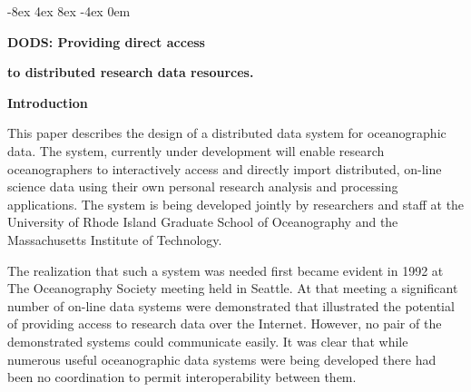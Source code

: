 
%



\topmargin -8ex
\footskip 4ex
\headheight 8ex
\footheight -4ex
\textwidth 6.25in
\textheight 8.25in
\oddsidemargin 0em
\def \dods{Distributed Oceanographic Data System }
\def \dodsns{Distributed Oceanographic Data System}
\def \1em{\hskip 1em}
\def \2em{\hskip 2em}
\def \3em{\hskip 3em}
\def \4em{\hskip 4em}
\def \dap{data access protocol }
\def \dapns{data access protocol}



\Large
\centerline {\bf DODS: Providing direct access }
\centerline {\bf to distributed research data resources.}
\normalsize

\renewcommand{\baselinestretch}{1.5}

\large
\bigskip
\noindent
{\bf Introduction}
\medskip
\normalsize 
\renewcommand{\baselinestretch}{1.5}

\noindent
This paper describes the design of a distributed data system for
oceanographic data. The system, currently under development will enable
research oceanographers to interactively access and directly import
distributed, on-line science data using their own personal research analysis
and processing applications. The system is being developed jointly by
researchers and staff at the University of Rhode Island Graduate School of
Oceanography and the Massachusetts Institute of Technology.

The realization that such a system was needed first became evident in 1992 at
The Oceanography Society meeting held in Seattle.  At that meeting a
significant number of on-line data systems were demonstrated that illustrated
the potential of providing access to research data over the Internet.
However, no pair of the demonstrated systems could communicate easily.  It
was clear that while numerous useful oceanographic data systems were being
developed there had been no coordination to permit interoperability between
them.

